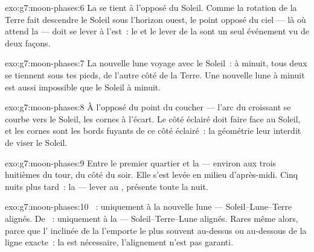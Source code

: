 \begin{solution}{exo:g7:moon-phases:6}
La  se tient à l'opposé du Soleil. Comme la rotation de la
Terre fait descendre le Soleil sous l'horizon ouest, le point opposé
du ciel --- là où attend la  --- doit se lever à l'est~:
le  et le lever de la  sont un seul
événement vu de deux façons.
\end{solution}

\begin{solution}{exo:g7:moon-phases:7}
La nouvelle lune voyage avec le Soleil~: à minuit, tous deux se
tiennent sous tes pieds, de l'autre côté de la Terre. Une nouvelle
lune à minuit est aussi impossible que le Soleil à minuit.
\end{solution}

\begin{solution}{exo:g7:moon-phases:8}
À l'opposé du point du coucher --- l'arc du croissant se courbe vers
le Soleil, les cornes à l'écart. Le côté éclairé doit faire face au
Soleil, et les cornes sont les bords fuyants de ce côté éclairé~: la
géométrie leur interdit de viser le Soleil.
\end{solution}

\begin{solution}{exo:g7:moon-phases:9}
Entre le premier quartier et la  --- environ aux trois
huitièmes du tour, du côté du soir. Elle s'est levée en milieu
d'après-midi. Cinq nuits plus tard~: la  --- lever au
, présente toute la nuit.
\end{solution}

\begin{solution}{exo:g7:moon-phases:10}
~: uniquement à la nouvelle lune ---
Soleil--Lune--Terre alignés. De ~: uniquement à la 
--- Soleil--Terre--Lune alignés. Rares même alors, parce que
l' inclinée de la  l'emporte le plus souvent au-dessus ou
au-dessous de la ligne exacte~: la  est nécessaire,
l'alignement n'est pas garanti.
\end{solution}

